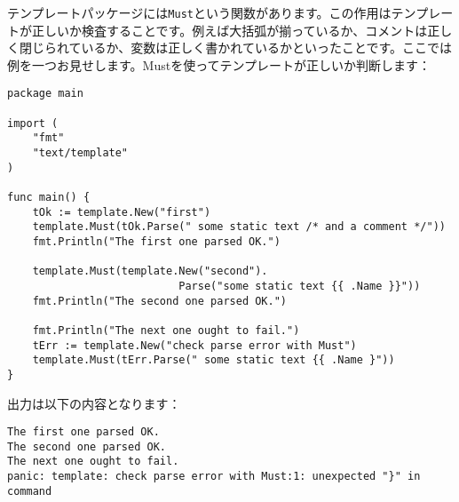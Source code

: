 テンプレートパッケージには\texttt{Must}という関数があります。この作用はテンプレートが正しいか検査することです。例えば大括弧が揃っているか、コメントは正しく閉じられているか、変数は正しく書かれているかといったことです。ここでは例を一つお見せします。Mustを使ってテンプレートが正しいか判断します：


\begin{lstlisting}[numbers=none]
package main

import (
    "fmt"
    "text/template"
)

func main() {
    tOk := template.New("first")
    template.Must(tOk.Parse(" some static text /* and a comment */"))
    fmt.Println("The first one parsed OK.")

    template.Must(template.New("second").
                           Parse("some static text {{ .Name }}"))
    fmt.Println("The second one parsed OK.")

    fmt.Println("The next one ought to fail.")
    tErr := template.New("check parse error with Must")
    template.Must(tErr.Parse(" some static text {{ .Name }"))
}
\end{lstlisting}

出力は以下の内容となります：

\begin{lstlisting}[numbers=none]
The first one parsed OK.
The second one parsed OK.
The next one ought to fail.
panic: template: check parse error with Must:1: unexpected "}" in command
\end{lstlisting}

